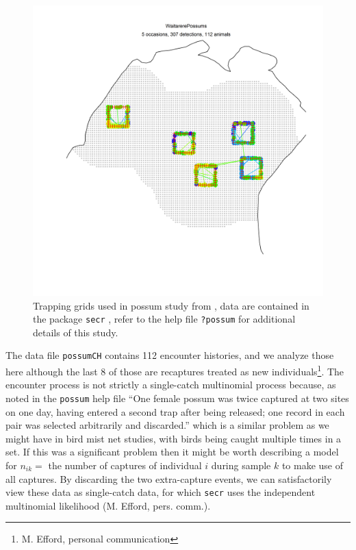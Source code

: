 \begin{figure}
\centering
\includegraphics[width=5in]{Ch5-PoisMn/figs/possum.png}
\caption{Trapping grids used in possum study from
  \citet{efford_etal:2005}, data are contained in the \R
package \mbox{\tt secr}
\citep{efford:2011}, refer to the help file \mbox{\tt ?possum} for
additional details of this study.}
\label{poisson-mn.fig.possum}
\end{figure}

The data file \mbox{\tt possumCH} contains 112 encounter histories,
and we analyze those here although the last 8 of those are recaptures
treated as new individuals\footnote{M. Efford, personal communication}.
The encounter process is not strictly a single-catch multinomial process because,
as noted in the \mbox{\tt possum} help file
 ``One female possum was twice captured at two
sites on one day, having entered a second trap after being released;
one record in each pair was selected arbitrarily and discarded.''
which is a similar problem as we might have in bird mist net studies,
with birds being caught multiple times in a set.
If this was a significant problem then it might be worth describing a
model for $n_{ik} = $ the number of captures of individual $i$ during
sample $k$ to make use of all captures. By discarding the two
extra-capture events, we can satisfactorily view these data as
single-catch data, for which \mbox{\tt secr} uses the independent
multinomial likelihood (M. Efford, pers. comm.).

